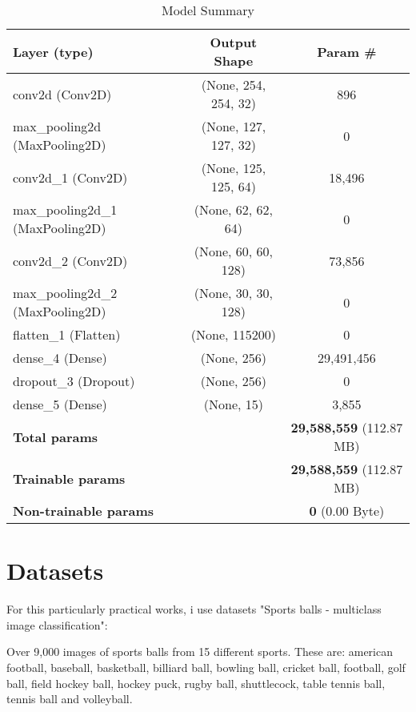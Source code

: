 \documentclass{article}
\begin{document}
\begin{table}[h!]
    \centering
    \begin{tabular}{|l|c|c|}
    \hline
    \textbf{Layer (type)}         & \textbf{Output Shape} & \textbf{Param \#} \\ \hline
    conv2d (Conv2D)               & (None, 254, 254, 32)  & 896               \\ \hline
    max\_pooling2d (MaxPooling2D) & (None, 127, 127, 32)  & 0                 \\ \hline
    conv2d\_1 (Conv2D)            & (None, 125, 125, 64)  & 18,496            \\ \hline
    max\_pooling2d\_1 (MaxPooling2D) & (None, 62, 62, 64)  & 0                 \\ \hline
    conv2d\_2 (Conv2D)            & (None, 60, 60, 128)   & 73,856            \\ \hline
    max\_pooling2d\_2 (MaxPooling2D) & (None, 30, 30, 128) & 0                 \\ \hline
    flatten\_1 (Flatten)          & (None, 115200)        & 0                 \\ \hline
    dense\_4 (Dense)              & (None, 256)           & 29,491,456        \\ \hline
    dropout\_3 (Dropout)          & (None, 256)           & 0                 \\ \hline
    dense\_5 (Dense)              & (None, 15)            & 3,855             \\ \hline
    \multicolumn{2}{|l|}{\textbf{Total params}}          & \textbf{29,588,559} (112.87 MB) \\ \hline
    \multicolumn{2}{|l|}{\textbf{Trainable params}}      & \textbf{29,588,559} (112.87 MB) \\ \hline
    \multicolumn{2}{|l|}{\textbf{Non-trainable params}}  & \textbf{0} (0.00 Byte) \\ \hline
    \end{tabular}
    \caption{Model Summary}
    \end{table}

\section{Datasets}
For this particularly practical works, i use datasets "Sports balls - multiclass image classification": 

Over 9,000 images of sports balls from 15 different sports. These are: american football, baseball, basketball, billiard ball, bowling ball, cricket ball, football, golf ball, field hockey ball, hockey puck, rugby ball, shuttlecock, table tennis ball, tennis ball and volleyball.
\end{document}
